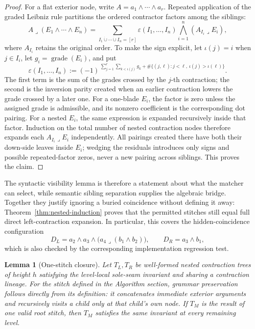 \documentclass[11pt]{article}
\newtheorem{lemma}{Lemma}
\begin{document}
\begin{proof}
For a flat exterior node, write \(A=a_1\wedge\cdots\wedge a_r\). Repeated
application of the graded Leibniz rule partitions the ordered contractor
factors among the siblings:
\[
A\mathbin{\lrcorner}(E_1\wedge\cdots\wedge E_n)
=\sum_{I_1\mathbin{\dot\cup}\cdots\mathbin{\dot\cup}I_n=[r]}
\varepsilon(I_1,\ldots,I_n)
\bigwedge_{i=1}^{n}(A_{I_i}\mathbin{\lrcorner}E_i),
\]
where \(A_{I_i}\) retains the original order. To make the sign explicit, let
\(\iota(j)=i\) when \(j\in I_i\), let
\(g_i=\operatorname{grade}(E_i)\), and put
\[
\varepsilon(I_1,\ldots,I_n)
:=(-1)^{\,
 \sum_{j=1}^{r}\sum_{k<\iota(j)}g_k
 +\#\{(j,\ell):j<\ell,\ \iota(j)>\iota(\ell)\}}.
\]
The first term is the sum of the grades crossed by the \(j\)-th contraction;
the second is the inversion parity created when an earlier contraction lowers
the grade crossed by a later one. For a one-blade \(E_i\), the factor is
zero unless the assigned grade is admissible, and its nonzero coefficient is
the corresponding dot pairing. For a nested \(E_i\), the same expression is
expanded recursively inside that factor. Induction on the total number of
nested contraction nodes therefore expands each
\(A_{I_i}\mathbin{\lrcorner}E_i\) independently. All pairings created there
have both their down-side leaves inside \(E_i\); wedging the residuals
introduces only signs and possible repeated-factor zeros, never a new pairing
across siblings. This proves the claim.
\end{proof}

The syntactic visibility lemma is therefore a statement about what the
matcher can select, while semantic sibling separation supplies the algebraic
bridge. Together they justify ignoring a buried coincidence without defining
it away: Theorem~\ref{thm:nested-induction} proves that the permitted stitches
still equal full direct left-contraction expansion. In particular, this covers
the hidden-coincidence configuration
\[
D_L=a_2\wedge a_3\wedge
 \bigl(a_4\mathbin{\lrcorner}(b_1\wedge b_2)\bigr),
\qquad D_R=a_3\wedge b_1,
\]
which is also checked by the corresponding implementation regression test.

\begin{lemma}[One-stitch closure]
\label{lem:one-stitch-closure}
Let \(T_L,T_R\) be well-formed nested contraction trees of height \(h\)
satisfying the level-local sole-seam invariant and sharing a contraction
lineage. For the stitch defined in the Algorithm section, grammar preservation
follows directly from its definition: it concatenates immediate exterior
arguments and recursively visits a child only at that child's own node. If
\(T_M\) is the result of one valid root stitch, then \(T_M\) satisfies the same
invariant at every remaining level.
\end{lemma}
\end{document}
